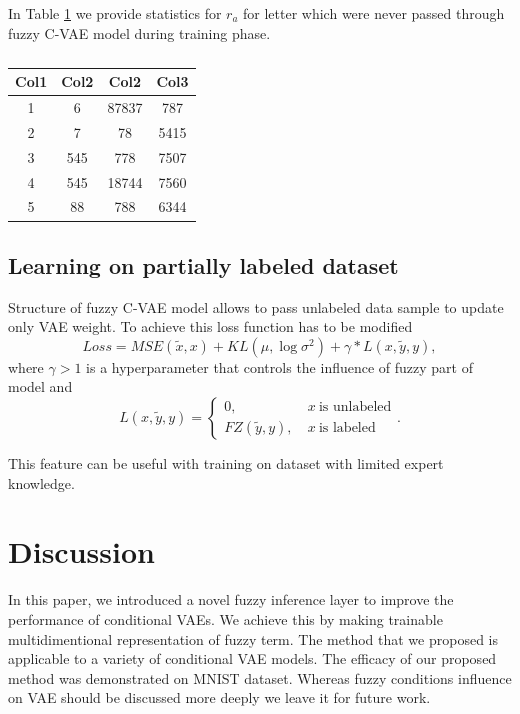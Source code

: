 \documentclass[runningheads]{llncs}
\begin{document}
In Table \ref{table-anomaly} we provide statistics for $r_{a}$ for letter which were never passed through fuzzy C-VAE model during training phase.

\begin{table}[h!]
    \centering
    \begin{tabular}{||c c c c||} 
     \hline
     Col1 & Col2 & Col2 & Col3 \\ [0.5ex] 
     \hline\hline
     1 & 6 & 87837 & 787 \\ 
     2 & 7 & 78 & 5415 \\
     3 & 545 & 778 & 7507 \\
     4 & 545 & 18744 & 7560 \\
     5 & 88 & 788 & 6344 \\ [1ex] 
     \hline
    \end{tabular}
    \caption{}
    \label{table-anomaly}
\end{table}

\subsection{Learning on partially labeled dataset}

Structure of fuzzy C-VAE model allows to pass unlabeled data sample to update only VAE weight.
To achieve this loss function has to be modified
\[
    Loss = MSE(\tilde{x}, x) + KL(\mu, \log{\sigma^2}) + \gamma * L(x, \tilde{y}, y),
\]
where $\gamma > 1$ is a hyperparameter that controls the influence of fuzzy part of model and
\[
    L(x, \tilde{y}, y) = \begin{cases}
        0,&~x~\mbox{is~unlabeled}\\
        FZ(\tilde{y}, y),&~x~\mbox{is~labeled}
      \end{cases}.
\]


This feature can be useful with training on dataset with limited expert knowledge. 


\section{Discussion}


In this paper, we introduced a novel fuzzy inference layer to improve the performance of conditional VAEs. 
We achieve this by making trainable multidimentional representation of fuzzy term.
The method that we proposed is applicable to a variety of conditional VAE models. 
The efficacy of our proposed method was demonstrated on MNIST dataset. 
Whereas fuzzy conditions influence on VAE should be discussed more deeply we leave it for future work. 



\end{document}
